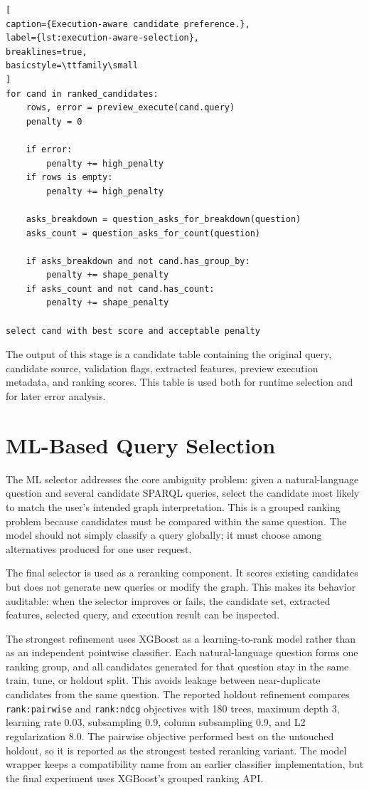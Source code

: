 \documentclass[
  12pt,
  english,
  oneside]{report}
\begin{document}
\begin{lstlisting}[
caption={Execution-aware candidate preference.},
label={lst:execution-aware-selection},
breaklines=true,
basicstyle=\ttfamily\small
]
for cand in ranked_candidates:
    rows, error = preview_execute(cand.query)
    penalty = 0

    if error:
        penalty += high_penalty
    if rows is empty:
        penalty += high_penalty

    asks_breakdown = question_asks_for_breakdown(question)
    asks_count = question_asks_for_count(question)

    if asks_breakdown and not cand.has_group_by:
        penalty += shape_penalty
    if asks_count and not cand.has_count:
        penalty += shape_penalty

select cand with best score and acceptable penalty
\end{lstlisting}

The output of this stage is a candidate table containing the original query, candidate source, validation flags, extracted features, preview execution metadata, and ranking scores. This table is used both for runtime selection and for later error analysis.

\section{ML-Based Query Selection}
\label{sec:ml-based-query-selection}

The ML selector addresses the core ambiguity problem: given a natural-language question and several candidate SPARQL queries, select the candidate most likely to match the user's intended graph interpretation. This is a grouped ranking problem because candidates must be compared within the same question. The model should not simply classify a query globally; it must choose among alternatives produced for one user request.

The final selector is used as a reranking component. It scores existing candidates but does not generate new queries or modify the graph. This makes its behavior auditable: when the selector improves or fails, the candidate set, extracted features, selected query, and execution result can be inspected.

The strongest refinement uses XGBoost as a learning-to-rank model rather than as an independent pointwise classifier. Each natural-language question forms one ranking group, and all candidates generated for that question stay in the same train, tune, or holdout split. This avoids leakage between near-duplicate candidates from the same question. The reported holdout refinement compares \texttt{rank:pairwise} and \texttt{rank:ndcg} objectives with 180 trees, maximum depth 3, learning rate 0.03, subsampling 0.9, column subsampling 0.9, and L2 regularization 8.0. The pairwise objective performed best on the untouched holdout, so it is reported as the strongest tested reranking variant. The model wrapper keeps a compatibility name from an earlier classifier implementation, but the final experiment uses XGBoost's grouped ranking API.
\end{document}
